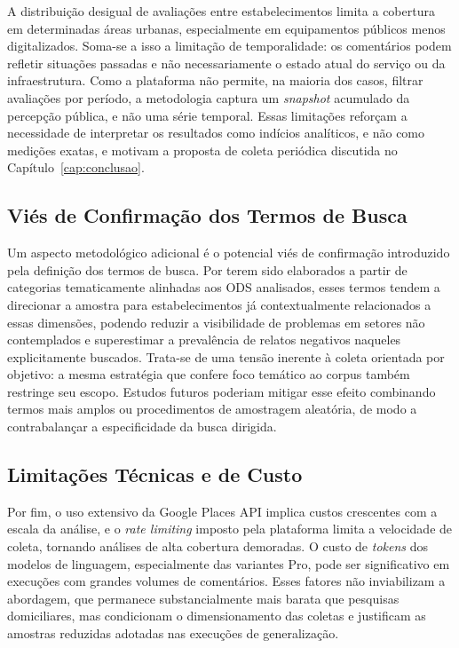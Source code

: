 A distribuição desigual de avaliações entre estabelecimentos limita a cobertura em determinadas áreas urbanas, especialmente em equipamentos públicos menos digitalizados. Soma-se a isso a limitação de temporalidade: os comentários podem refletir situações passadas e não necessariamente o estado atual do serviço ou da infraestrutura. Como a plataforma não permite, na maioria dos casos, filtrar avaliações por período, a metodologia captura um \textit{snapshot} acumulado da percepção pública, e não uma série temporal. Essas limitações reforçam a necessidade de interpretar os resultados como indícios analíticos, e não como medições exatas, e motivam a proposta de coleta periódica discutida no Capítulo~\ref{cap:conclusao}.

\subsection{Viés de Confirmação dos Termos de Busca}
\label{subsec:disc-vies-termos}

Um aspecto metodológico adicional é o potencial viés de confirmação introduzido pela definição dos termos de busca. Por terem sido elaborados a partir de categorias tematicamente alinhadas aos ODS analisados, esses termos tendem a direcionar a amostra para estabelecimentos já contextualmente relacionados a essas dimensões, podendo reduzir a visibilidade de problemas em setores não contemplados e superestimar a prevalência de relatos negativos naqueles explicitamente buscados. Trata-se de uma tensão inerente à coleta orientada por objetivo: a mesma estratégia que confere foco temático ao corpus também restringe seu escopo. Estudos futuros poderiam mitigar esse efeito combinando termos mais amplos ou procedimentos de amostragem aleatória, de modo a contrabalançar a especificidade da busca dirigida.

\subsection{Limitações Técnicas e de Custo}
\label{subsec:disc-lim-tecnicas}

Por fim, o uso extensivo da Google Places API implica custos crescentes com a escala da análise, e o \textit{rate limiting} imposto pela plataforma limita a velocidade de coleta, tornando análises de alta cobertura demoradas. O custo de \textit{tokens} dos modelos de linguagem, especialmente das variantes Pro, pode ser significativo em execuções com grandes volumes de comentários. Esses fatores não inviabilizam a abordagem, que permanece substancialmente mais barata que pesquisas domiciliares, mas condicionam o dimensionamento das coletas e justificam as amostras reduzidas adotadas nas execuções de generalização.

